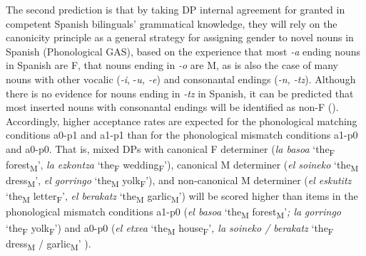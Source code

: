 \documentclass[output=paper]{langscibook}
\begin{document}
The second prediction is that by taking DP internal agreement for granted in competent Spanish bilinguals’ grammatical knowledge, they will rely on the canonicity principle as a general strategy for assigning gender to novel nouns in Spanish (Phonological GAS), based on the experience that most \textit{-a} ending nouns in Spanish are F, that nouns ending in \textit{-o} are M, as is also the case of many nouns with other vocalic (\textit{-i}, -\textit{u, -e}) and consonantal endings (\textit{{}-n, -tz}). Although there is no evidence for nouns ending in \textit{-tz} in Spanish, it can be predicted that most inserted nouns with consonantal endings will be identified as non-F (\citealt{Harris1991,TeschnerRussell1984}). Accordingly, higher acceptance rates are expected for the phonological matching conditions a0-p1 and a1-p1 than for the phonological mismatch conditions a1-p0 and a0-p0. That is, mixed DPs with canonical F determiner (\textit{la basoa}  ‘the\textsubscript{F} forest\textsubscript{M}’, \textit{la ezkontza} ‘the\textsubscript{F} wedding\textsubscript{F}’), canonical M determiner (\textit{el soineko} ‘the\textsubscript{M} dress\textsubscript{M}’, \textit{el gorringo} ‘the\textsubscript{M} yolk\textsubscript{F}’), and non-canonical M determiner (\textit{el eskutitz} ‘the\textsubscript{M} letter\textsubscript{F}’, \textit{el berakatz} ‘the\textsubscript{M} garlic\textsubscript{M}’) will be scored higher than items in the phonological mismatch conditions a1-p0 (\textit{el basoa} ‘the\textsubscript{M} forest\textsubscript{M}’\textit{; la} \textit{gorringo} ‘the\textsubscript{F} yolk\textsubscript{F}’) and a0-p0 (\textit{el etxea} ‘the\textsubscript{M} house\textsubscript{F}’\textit{, la soineko / berakatz} ‘the\textsubscript{F} dress\textsubscript{M} / garlic\textsubscript{M}’\textbf{ }).
\end{document}
